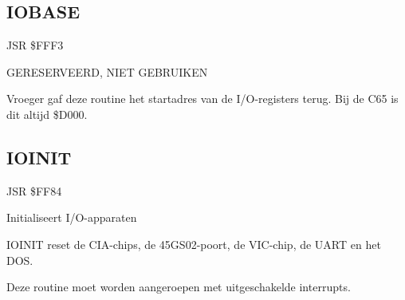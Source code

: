 
\newpage
\subsection{IOBASE}
\label{KERNAL Jump Table!IOBASE}
\begin{description}[leftmargin=2cm,style=nextline]
    \item [Adres:] JSR \$FFF3    \item [Omschrijving:] GERESERVEERD, NIET GEBRUIKEN    \item [Opmerkingen:]        Vroeger gaf deze routine het startadres van de I/O-registers terug. Bij de C65 is dit altijd \$D000.
\end{description}



\newpage
\subsection{IOINIT}
\label{KERNAL Jump Table!IOINIT}
\begin{description}[leftmargin=2cm,style=nextline]
    \item [Adres:] JSR \$FF84    \item [Omschrijving:] Initialiseert I/O-apparaten    \item [Opmerkingen:]        IOINIT reset de CIA-chips, de 45GS02-poort, de VIC-chip, de UART en het DOS.

        Deze routine moet worden aangeroepen met uitgeschakelde interrupts.    \item [Voorbeeld:]
\end{description}



\newpage
